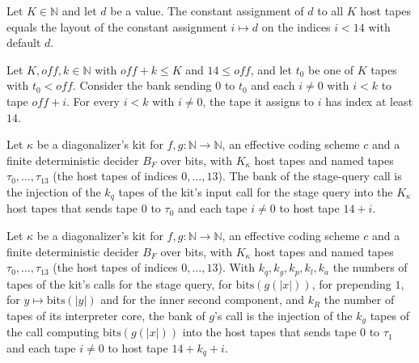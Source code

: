 \begin{theorem}
\label{Turing.NTimeDiag.dzLay_const}
\leanok
{}
Let $K \in \mathbb{N}$ and let $d$ be a value. The constant assignment of $d$ to all $K$ host tapes equals the layout of the constant assignment $i \mapsto d$ on the indices $i < 14$ with default $d$.
\end{theorem}

\begin{theorem}
\label{Turing.NTimeDiag.dz_bank_off}
\leanok
{}
Let $K, \mathit{off}, k \in \mathbb{N}$ with $\mathit{off} + k \le K$ and $14 \le \mathit{off}$, and let $t_0$ be one of $K$ tapes with $t_0 < \mathit{off}$. Consider the bank sending $0$ to $t_0$ and each $i \ne 0$ with $i < k$ to tape $\mathit{off} + i$. For every $i < k$ with $i \ne 0$, the tape it assigns to $i$ has index at least $14$.
\end{theorem}

\begin{definition}
\label{Turing.NTimeDiag.DzKit.bQ}
\leanok
{}
Let $\kappa$ be a diagonalizer's kit for $f, g : \mathbb{N} \to \mathbb{N}$, an effective coding scheme $c$ and a finite deterministic decider $B_F$ over bits, with $K_\kappa$ host tapes and named tapes $\tau_0, \dots, \tau_{13}$ (the host tapes of indices $0, \dots, 13$). The bank of the stage-query call is the injection of the $k_q$ tapes of the kit's input call for the stage query into the $K_\kappa$ host tapes that sends tape $0$ to $\tau_0$ and each tape $i \ne 0$ to host tape $14 + i$.
\end{definition}

\begin{definition}
\label{Turing.NTimeDiag.DzKit.bG}
\leanok
{}
Let $\kappa$ be a diagonalizer's kit for $f, g : \mathbb{N} \to \mathbb{N}$, an effective coding scheme $c$ and a finite deterministic decider $B_F$ over bits, with $K_\kappa$ host tapes and named tapes $\tau_0, \dots, \tau_{13}$ (the host tapes of indices $0, \dots, 13$). With $k_q, k_g, k_p, k_l, k_a$ the numbers of tapes of the kit's calls for the stage query, for $\mathrm{bits}(g(|x|))$, for prepending $1$, for $y \mapsto \mathrm{bits}(|y|)$ and for the inner second component, and $k_R$ the number of tapes of its interpreter core, the bank of $g$'s call is the injection of the $k_g$ tapes of the call computing $\mathrm{bits}(g(|x|))$ into the host tapes that sends tape $0$ to $\tau_1$ and each tape $i \ne 0$ to host tape $14 + k_q + i$.
\end{definition}

